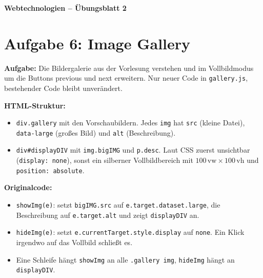\documentclass[11pt,a4paper]{article}
\begin{document}
\begin{center}
  {\Large\textbf{Webtechnologien -- Übungsblatt 2}}
\end{center}
\section*{Aufgabe 6: Image Gallery}
\textbf{Aufgabe:} Die Bildergalerie aus der Vorlesung verstehen und im
Vollbildmodus um die Buttons \glqq previous\grqq{} und \glqq next\grqq{}
erweitern. Nur neuer Code in \texttt{gallery.js}, bestehender Code bleibt
unverändert.

\medskip
\textbf{HTML-Struktur:}
\begin{itemize}
  \item \texttt{div.gallery} mit den Vorschaubildern. Jedes \texttt{img}
    hat \texttt{src} (kleine Datei), \texttt{data-large} (großes Bild) und
    \texttt{alt} (Beschreibung).
  \item \texttt{div\#displayDIV} mit \texttt{img.bigIMG} und
    \texttt{p.desc}. Laut CSS zuerst unsichtbar (\texttt{display: none}),
    sonst ein silberner Vollbildbereich mit $100\,\mathrm{vw} \times
    100\,\mathrm{vh}$ und \texttt{position: absolute}.
\end{itemize}

\textbf{Originalcode:}
\begin{itemize}
  \item \texttt{showImg(e)}: setzt \texttt{bigIMG.src} auf
    \texttt{e.target.dataset.large}, die Beschreibung auf
    \texttt{e.target.alt} und zeigt \texttt{displayDIV} an.
  \item \texttt{hideImg(e)}: setzt \texttt{e.currentTarget.style.display}
    auf \texttt{none}. Ein Klick irgendwo auf das Vollbild schließt es.
  \item Eine Schleife hängt \texttt{showImg} an alle
    \texttt{.gallery img}, \texttt{hideImg} hängt an \texttt{displayDIV}.
\end{itemize}
\end{document}
